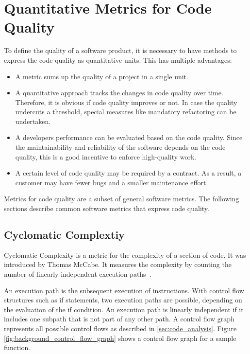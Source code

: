 \section{Quantitative Metrics for Code Quality}
To define the quality of a software product, it is necessary to have methods to express the code quality as quantitative units. This has multiple advantages:
\begin{itemize}
    \item A metric sums up the quality of a project in a single unit.
    \item A quantitative approach tracks the changes in code quality over time. Therefore, it is obvious if code quality improves or not. In case the quality undercuts a threshold, special measures like mandatory refactoring can be undertaken.
    \item A developers performance can be evaluated based on the code quality. Since the maintainability and reliability of the software depends on the code quality, this is a good incentive to enforce high-quality work.
    \item A certain level of code quality may be required by a contract. As a result, a customer may have fewer bugs and a smaller maintenance effort.
\end{itemize}
Metrics for code quality are a subset of general software metrics. The following sections describe common software metrics that express code quality.

\subsection{Cyclomatic Complextiy}\label{sec:cyclomatic_complexity}
Cyclomatic Complexity is a metric for the complexity of a section of code. It was introduced by Thomas McCabe. It measures the complexity by counting the number of linearly independent execution paths~\cite{mccabe_complexity_1976}. 

An execution path is the subsequent execution of instructions. With control flow structures such as if statements, two execution paths are possible, depending on the evaluation of the if condition. An execution path is linearly independent if it includes one subpath that is not part of any other path. A control flow graph represents all possible control flows as described in \ref{sec:code_analysis}. Figure \ref{fig:background_control_flow_graph} shows a control flow graph for a sample function.

